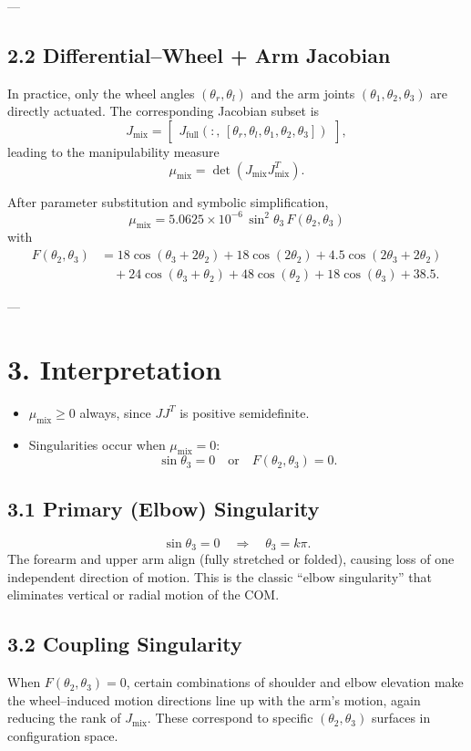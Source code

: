 \documentclass[12pt,a4paper]{article}
\begin{document}
---

\subsection*{2.2 Differential--Wheel + Arm Jacobian}

In practice, only the wheel angles $(\theta_r,\theta_l)$ and the arm joints $(\theta_1,\theta_2,\theta_3)$ are directly actuated.  
The corresponding Jacobian subset is
\[
J_{\text{mix}} =
\begin{bmatrix}
J_{\text{full}}(:,\, [\theta_r,\theta_l,\theta_1,\theta_2,\theta_3])
\end{bmatrix},
\]
leading to the manipulability measure
\[
\mu_{\text{mix}} = \det(J_{\text{mix}}J_{\text{mix}}^{T}).
\]

After parameter substitution and symbolic simplification,
\[
\boxed{
\mu_{\text{mix}}
= 5.0625\times10^{-6}
\,\sin^{2}\theta_3
\,F(\theta_2,\theta_3)
}
\]
with
\begin{align*}
F(\theta_2,\theta_3) &=
18\cos(\theta_3 + 2\theta_2)
+18\cos(2\theta_2)
+4.5\cos(2\theta_3 + 2\theta_2)
\\ &\quad
+24\cos(\theta_3 + \theta_2)
+48\cos(\theta_2)
+18\cos(\theta_3)
+38.5.
\end{align*}

---

\section*{3. Interpretation}

\begin{itemize}
\item $\mu_{\text{mix}} \ge 0$ always, since $J J^{T}$ is positive semidefinite.
\item Singularities occur when $\mu_{\text{mix}} = 0$:
\[
\sin\theta_3 = 0 \quad \text{or} \quad F(\theta_2,\theta_3)=0.
\]
\end{itemize}

\subsection*{3.1 Primary (Elbow) Singularity}
\[
\sin\theta_3 = 0 \quad\Rightarrow\quad \theta_3 = k\pi.
\]
The forearm and upper arm align (fully stretched or folded),
causing loss of one independent direction of motion.
This is the classic ``elbow singularity'' that eliminates vertical or radial motion of the COM.

\subsection*{3.2 Coupling Singularity}
When \(F(\theta_2,\theta_3)=0\),
certain combinations of shoulder and elbow elevation make
the wheel--induced motion directions line up with the arm's motion, again
reducing the rank of $J_{\text{mix}}$.
These correspond to specific \((\theta_2,\theta_3)\) surfaces in configuration space.
\end{document}
